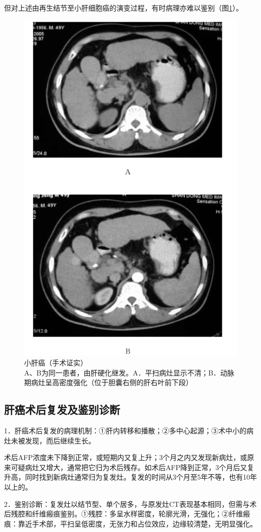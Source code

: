 但对上述由再生结节至小肝细胞癌的演变过程，有时病理亦难以鉴别（图\ref{fig11-3}）。

\begin{figure}[!htbp]
 \centering
 \includegraphics[width=.7\textwidth,height=\textheight,keepaspectratio]{./images/Image00274.jpg}
 \captionsetup{justification=centering}
 \caption{小肝癌（手术证实）\\{\small A、B为同一患者，由肝硬化继发。A．平扫病灶显示不清；B．动脉期病灶呈高密度强化（位于胆囊右侧的肝右叶前下段）}}
 \label{fig11-3}
  \end{figure} 

\subsection{肝癌术后复发及鉴别诊断}

1．肝癌术后复发的病理机制：①肝内转移和播散；②多中心起源；③术中小的病灶未被发现，而后继续生长。

术后AFP浓度未下降到正常，或短期内又复上升；3个月之内又发现新病灶，或原来可疑病灶又增大，通常把它归为术后残存。如术后AFP降到正常，3个月后又复升高，同时找到新病灶通常归为复发灶。复发的时间从3个月至5年不等，也有10年以上的。

2．鉴别诊断：复发灶以结节型、单个居多，与原发灶CT表现基本相同，但需与术后残腔和纤维瘢痕鉴别。①残腔：多呈水样密度，轮廓光滑，无强化；②纤维瘢痕：靠近手术部，平扫呈低密度，无张力和占位效应，边缘较清楚，无明显强化。

